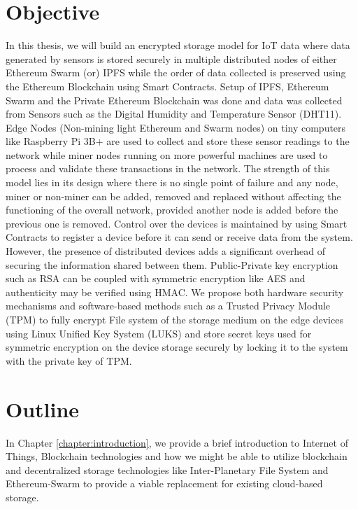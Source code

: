 \documentclass[11pt,openright]{report}
\begin{document}
\section{Objective}\label{section:objective}
In this thesis, we will build an encrypted storage model for IoT data where data generated by sensors is stored securely in multiple distributed nodes of either Ethereum Swarm (or) IPFS while the order of data collected is preserved using the Ethereum Blockchain using Smart Contracts. Setup of IPFS, Ethereum Swarm and the Private Ethereum Blockchain was done and data was collected from Sensors such as the Digital Humidity and Temperature Sensor (DHT11). Edge Nodes (Non-mining light Ethereum and Swarm nodes) on tiny computers like Raspberry Pi 3B+ are used to collect and store these sensor readings to the network while miner nodes running on more powerful machines are used to process and validate these transactions in the network. The strength of this model lies in its design where there is no single point of failure and any node, miner or non-miner can be added, removed and replaced without affecting the functioning of the overall  network, provided another node is added before the previous one is removed. Control over the devices is maintained by using Smart Contracts to register a device before it can send or receive data from the system. However, the presence of distributed devices adds a significant overhead of securing the information shared between them. Public-Private key encryption such as RSA can be coupled with symmetric encryption like AES and authenticity may be verified using HMAC. We propose both hardware security mechanisms and software-based methods such as a Trusted Privacy Module (TPM) to fully encrypt File system of the storage medium on the edge devices using Linux Unified Key System (LUKS) and store secret keys used for symmetric encryption on the device storage securely by locking it to the system with the private key of TPM.

\section{Outline}\label{section:outline}

In Chapter \ref{chapter:introduction}, we provide a brief introduction to Internet of Things, Blockchain technologies and how we might be able to utilize blockchain and decentralized storage technologies like Inter-Planetary File System and Ethereum-Swarm to provide a viable replacement for existing cloud-based storage.\newline
\end{document}
